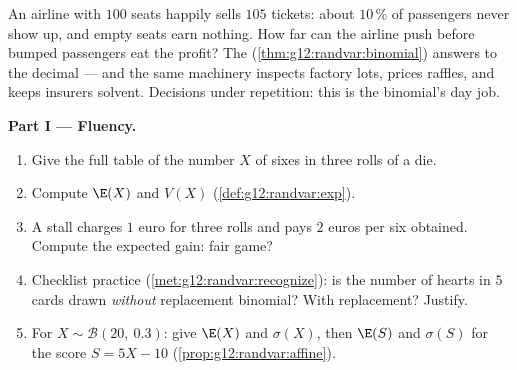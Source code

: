 \begin{problem}
\label{pb:g12:randvar:1}
An airline with $100$ seats happily sells $105$ tickets: about
$10\,\%$ of passengers never show up, and empty seats earn
nothing. How far can the airline push before bumped passengers
eat the profit? The 
(\cref{thm:g12:randvar:binomial}) answers to the decimal --- and
the same machinery inspects factory lots, prices raffles, and
keeps insurers solvent. Decisions under repetition: this is the
binomial's day job.

\medskip
\noindent\textbf{Part I --- Fluency.}
\begin{enumerate}
  \item Give the full  table of the number $X$ of
        sixes in three rolls of a die.
  \item Compute $\E(X)$ and $V(X)$
        (\cref{def:g12:randvar:exp}).
  \item A stall charges $1$ euro for three rolls and pays $2$
        euros per six obtained. Compute the expected gain: fair
        game?
  \item Checklist practice (\cref{met:g12:randvar:recognize}):
        is the number of hearts in $5$ cards drawn
        \emph{without} replacement binomial? With replacement?
        Justify.
  \item For $X \sim \mathcal B(20,\ 0.3)$: give $\E(X)$ and
        $\sigma(X)$, then $\E(S)$ and $\sigma(S)$ for the score
        $S = 5X - 10$ (\cref{prop:g12:randvar:affine}).
\end{enumerate}


\end{problem}

